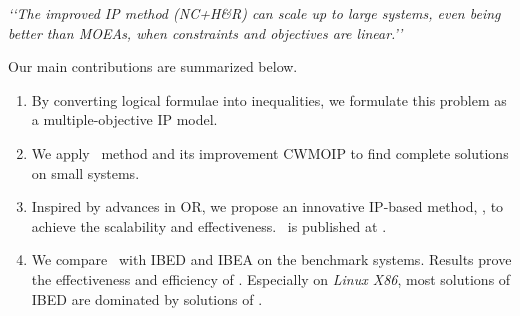 \vspace{-1mm}
\begin{center}
 \emph{\lq\lq{}The improved IP method (NC+H\&R) can scale up to large systems, even being better than MOEAs, when constraints and objectives are linear.\rq\rq}
\end{center}
\vspace{-1mm}

Our main contributions are summarized below.

\begin{enumerate}[itemsep=0.1mm]
\item By converting logical formulae into inequalities, we formulate this problem as a multiple-objective IP model.
\item We apply \naiveSol~method  and its improvement CWMOIP to find complete solutions on small systems.
\item Inspired by advances in OR, we propose an innovative IP-based method, \ourSol,  to achieve the scalability and effectiveness. \ourSol~is published at \cite{ourtool}.
\item We compare \ourSol~with IBED and IBEA on the benchmark systems. Results prove the effectiveness and efficiency of  \ourSol. Especially on \emph{Linux X86}, most solutions of IBED are dominated by solutions of \ourSol.


\end{enumerate}
%
